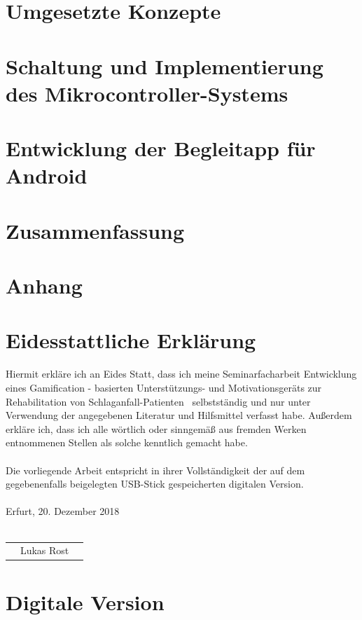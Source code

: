 \documentclass[a4paper, 11pt, titlepage, bibliography=totocnumbered]{scrartcl}
\begin{document}
\newpage
\section{Umgesetzte Konzepte}


\newpage
\section{Schaltung und Implementierung des Mikrocontroller-Systems}


\newpage
\section{Entwicklung der Begleitapp für Android}


\newpage
\section{Zusammenfassung}


\newpage


\newpage
\section{Anhang}


\newpage
\section*{Eidesstattliche Erklärung}
Hiermit erkläre ich an Eides Statt, dass ich meine Seminarfacharbeit \glqq Entwicklung eines Gamification - basierten Unterstützungs- und Motivationsgeräts zur Rehabilitation von Schlaganfall-Patienten\grqq ~ selbstständig und nur unter Verwendung der angegebenen Literatur und Hilfsmittel verfasst habe. Außerdem erkläre ich, dass ich alle wörtlich oder sinngemäß aus fremden Werken entnommenen Stellen als solche kenntlich gemacht habe.\\ \\
Die vorliegende Arbeit entspricht in ihrer Vollständigkeit der auf dem gegebenenfalls beigelegten USB-Stick gespeicherten digitalen Version.
\\ \\
Erfurt, 20. Dezember 2018
\\ \\
\begin{center}
\begin{tabular}{@{}l@{}}\hline
$\: \: \:$ Lukas Rost $\: \: \:$
\end{tabular}
\end{center}

\newpage
\section*{Digitale Version}
\vspace{2cm}
\hspace{0.5cm}
\end{document}
